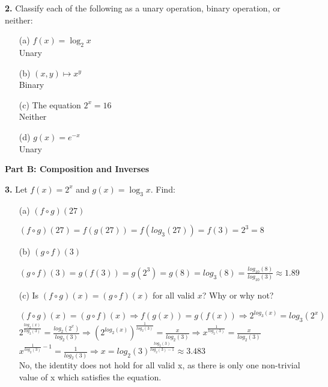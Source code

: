 \documentclass[12pt]{article}
\begin{document}
\textbf{2.} Classify each of the following as a unary operation, binary operation, or neither:

\begin{enumerate}
\item[(a)] $f(x) = \log_2 x$
\\[8pt] Unary

\item[(b)] $(x,y) \mapsto x^y$
\\[8pt] Binary

\item[(c)] The equation $2^x = 16$
\\[8pt] Neither

\item[(d)] $g(x) = e^{-x}$
\\[8pt] Unary
\end{enumerate}

\textbf{Part B: Composition and Inverses}

\textbf{3.} Let $f(x) = 2^x$ and $g(x) = \log_3 x$. Find:

\begin{enumerate}
\item[(a)] $(f \circ g)(27)$
\\[8pt]
\begin{minipage}[t][2cm][t]{\linewidth}
    $\displaystyle (f \circ g)(27) = f(g(27)) = f(log_3(27)) = f(3) = 2^3 = 8$
\end{minipage}

\item[(b)] $(g \circ f)(3)$
\\[8pt]
\begin{minipage}[t][2cm][t]{\linewidth}
    $\displaystyle (g \circ f)(3) = g(f(3)) = g(2^3) = g(8) = log_3(8) = \frac{log_{10}(8)}{log_{10}(3)} \approx 1.89$
\end{minipage}

\item[(c)] Is $(f \circ g)(x) = (g \circ f)(x)$ for all valid $x$? Why or why not?
\\[8pt]
\begin{minipage}[t][5cm][t]{\linewidth}
    $\displaystyle (f \circ g)(x) = (g \circ f)(x) \Rightarrow f(g(x)) = g(f(x)) \Rightarrow 2^{log_3(x)} = log_3(2^x)$
    \\[8pt] $2^{\frac{log_2(x)}{log_2(3)}} = \frac{log_2(2^x)}{log_2(3)} \Rightarrow (2^{log_2(x)})^{\frac{1}{log_2(3)}} = \frac{x}{log_2(3)} \Rightarrow x^{\frac{1}{log_2(3)}} = \frac{x}{log_2(3)}$
    \\[8pt] $x^{\frac{1}{log_2(3)}-1} = \frac{1}{log_2(3)} \Rightarrow x = log_2(3)^{\frac{log_2(3)}{log_2(3)-1}} \approx 3.483$
    \\[8pt] No, the identity does not hold for all valid x, as there is only one non-trivial value of x which satisfies the equation.
\end{minipage}
\end{enumerate}
\end{document}
